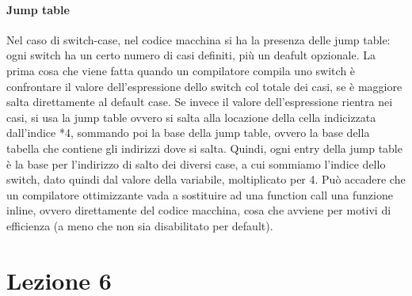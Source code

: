 \documentclass[12pt, oneside]{extbook}
\begin{document}
\subsubsection{Jump table}
Nel caso di switch-case, nel codice macchina si ha la presenza delle jump table: ogni switch ha un certo numero di casi definiti, più un deafult opzionale. La prima cosa che viene fatta quando un compilatore compila uno switch è confrontare il valore dell'espressione dello switch col totale dei casi, se è maggiore salta direttamente al default case. Se invece il valore dell'espressione rientra nei casi, si usa la jump table ovvero si salta alla locazione della cella indicizzata dall'indice *4, sommando poi la base della jump table, ovvero la base della tabella che contiene gli indirizzi dove si salta. Quindi, ogni entry della jump table è la base per l'indirizzo di salto dei diversi case, a cui sommiamo l'indice dello switch, dato quindi dal valore della variabile, moltiplicato per 4. Può accadere che un compilatore ottimizzante vada a sostituire ad una function call una funzione inline, ovvero direttamente del codice macchina, cosa che avviene per motivi di efficienza (a meno che non sia disabilitato per default).
\chapter{Lezione 6}
\end{document}

